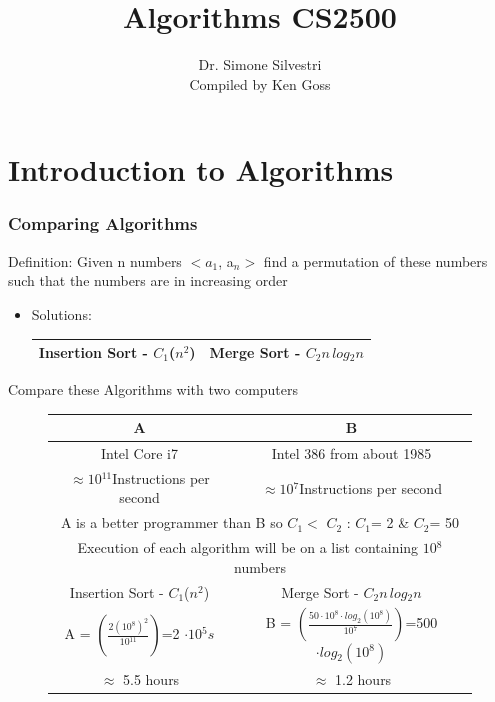 \documentclass[12pt,letterpaper]{article}
\title{Algorithms CS2500}
\author{Dr. Simone Silvestri \\ Compiled by Ken Goss}%
\begin{document}
\maketitle
\part{Introduction to Algorithms}

\section{Comparing Algorithms}
Definition: Given n numbers $<a_{1}$, a$_{n}>$ find a permutation
of these numbers such that the numbers are in increasing order
\begin{itemize}
\item Solutions: \\
\begin{tabular}{|c|c|} 
\hline
 Insertion Sort - $C_{1}$($n^{2}$) 
&
 Merge Sort - $C{}_{2}$$n\,log{}_{2}n$
\tabularnewline
\hline 
\end{tabular}
\end{itemize}
Compare these Algorithms with two computers 
\begin{figure}
\centering
\begin{tabular}{|c|c|}
\hline 
A & B\tabularnewline
\hline 
\hline 
Intel Core i7  & Intel 386 from about 1985 \tabularnewline
\hline 
$\approx 10{}^{11}$Instructions per second & $\approx 10{}^{7}$Instructions per second
\tabularnewline
\hline 
\multicolumn{2}{|c|}{A is a better programmer than B so $C_{1} <$ $C{}_{2}$ : $C{}_{1}$= 2 \& $C{}_{2}$= 50 }\tabularnewline
\hline 
\multicolumn{2}{|c|}{Execution of each algorithm will be on a list containing $10{}^{8}$
numbers}\tabularnewline
\hline
 Insertion Sort - $C_{1}$($n^{2}$) 
&
 Merge Sort - $C{}_{2}$$n\,log{}_{2}n$
\tabularnewline

\hline  
A = $\left(\frac{2(10^{8})^{2}}{10{}^{11}}\right)$=2 $\cdot 10{}^{5}s$  &   B = $\left(\frac{50 \cdot 10^{8} \cdot log_{2}(10^{8})}{10{}^{7}}\right)$=500 $\cdot log{}_{2}(10^{8})$  \tabularnewline 
\hline 
$\approx$ 5.5 hours & $\approx$ 1.2 hours
\tabularnewline
\hline 
\end{tabular}
\end{figure}
\pagebreak{}
\end{document}
